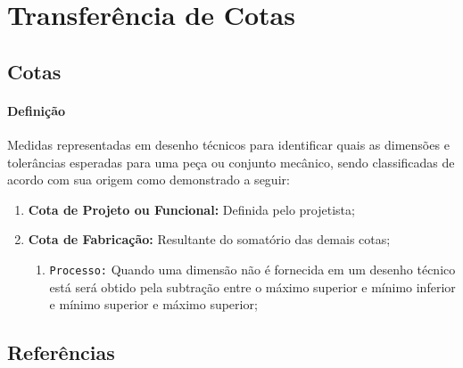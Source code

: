 \documentclass{article}
\begin{document}
\newpage

    \section{Transferência de Cotas}
        \subsection{Cotas}
            \paragraph{Definição}Medidas representadas em desenho técnicos para identificar quais as dimensões e tolerâncias esperadas para uma peça ou conjunto mecânico, sendo classificadas de acordo com sua origem como demonstrado a seguir:
                \begin{enumerate}[noitemsep]
                    \item \textbf{Cota de Projeto ou Funcional:} Definida pelo projetista;
                    \item \textbf{Cota de Fabricação:} Resultante do somatório das demais cotas;
                        \begin{enumerate}[noitemsep]
                            \item \texttt{Processo:} Quando uma dimensão não é fornecida em um desenho técnico está será obtido pela subtração entre o máximo superior e mínimo inferior e mínimo superior e máximo superior;
                        \end{enumerate}
                \end{enumerate}

        \subsection{Referências}
\end{document}
